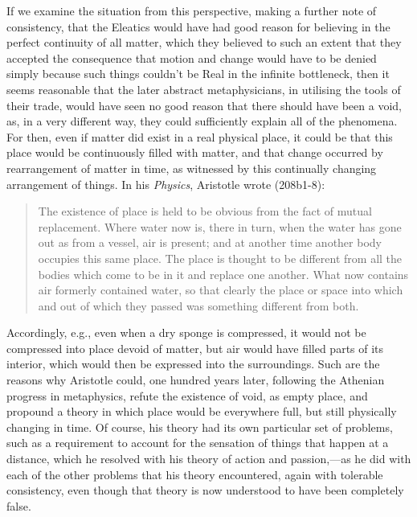 If we examine the situation from this perspective, making a further note of consistency, that the Eleatics would have had good reason for believing in the perfect continuity of all matter, which they believed to such an extent that they accepted the consequence that motion and change would have to be denied simply because such things couldn't be Real in the infinite bottleneck, then it seems reasonable that the later abstract metaphysicians, in utilising the tools of their trade, would have seen no good reason that there should have been a void, as, in a very different way, they could sufficiently explain all of the phenomena. For then, even if matter did exist in a real physical place, it could be that this place would be continuously filled with matter, and that change occurred by rearrangement of matter in time, as witnessed by this continually changing arrangement of things. In his \textit{Physics}, Aristotle wrote \cite{Aristotle1984} (208b1-8):
\begin{quotation}
The existence of place is held to be obvious from the fact of mutual replacement. Where water now is, there in turn, when the water has gone out as from a vessel, air is present; and at another time another body occupies this same place. The place is thought to be different from all the bodies which come to be in it and replace one another. What now contains air formerly contained water, so that clearly the place or space into which and out of which they passed was something different from both.
\end{quotation}
Accordingly, e.g., even when a dry sponge is compressed, it would not be compressed into place devoid of matter, but air would have filled parts of its interior, which would then be expressed into the surroundings. Such are the reasons why Aristotle could, one hundred years later, following the Athenian progress in metaphysics, refute the existence of void, as empty place, and propound a theory in which place would be everywhere full, but still physically changing in time. Of course, his theory had its own particular set of problems, such as a requirement to account for the sensation of things that happen at a distance, which he resolved with his theory of action and passion,---as he did with each of the other problems that his theory encountered, again with tolerable consistency, even though that theory is now understood to have been completely false.
